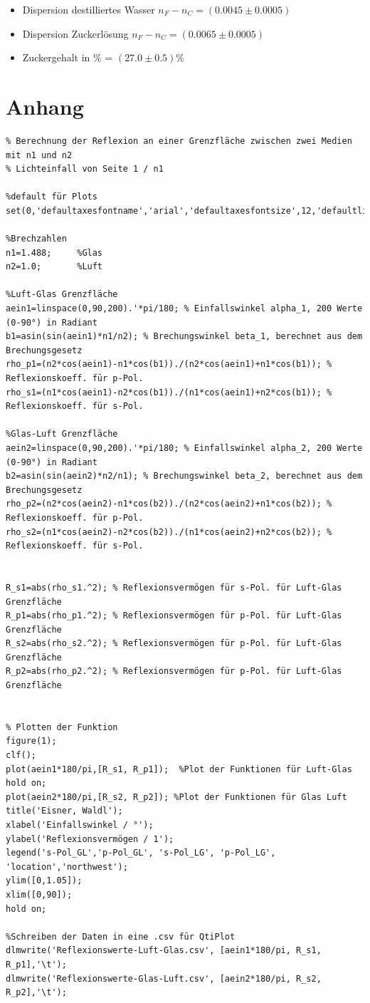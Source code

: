\documentclass[12pt,a4paper,twoside]{article}
\begin{document}
\begin{itemize}
    \item Dispersion destilliertes Wasser $n_F-n_C = (0.0045 \pm 0.0005)$
    \item Dispersion Zuckerlösung $n_F-n_C = (0.0065 \pm 0.0005)$
    \item Zuckergehalt in \% = $(27.0 \pm 0.5) \%$
\end{itemize}



\section{Anhang}

\begin{verbatim}
% Berechnung der Reflexion an einer Grenzfläche zwischen zwei Medien mit n1 und n2
% Lichteinfall von Seite 1 / n1

%default für Plots
set(0,'defaultaxesfontname','arial','defaultaxesfontsize',12,'defaultlinelinewidth',2);

%Brechzahlen
n1=1.488;     %Glas
n2=1.0;       %Luft             

%Luft-Glas Grenzfläche
aein1=linspace(0,90,200).'*pi/180; % Einfallswinkel alpha_1, 200 Werte (0-90°) in Radiant
b1=asin(sin(aein1)*n1/n2); % Brechungswinkel beta_1, berechnet aus dem Brechungsgesetz
rho_p1=(n2*cos(aein1)-n1*cos(b1))./(n2*cos(aein1)+n1*cos(b1)); % Reflexionskoeff. für p-Pol.
rho_s1=(n1*cos(aein1)-n2*cos(b1))./(n1*cos(aein1)+n2*cos(b1)); % Reflexionskoeff. für s-Pol.

%Glas-Luft Grenzfläche
aein2=linspace(0,90,200).'*pi/180; % Einfallswinkel alpha_2, 200 Werte (0-90°) in Radiant
b2=asin(sin(aein2)*n2/n1); % Brechungswinkel beta_2, berechnet aus dem Brechungsgesetz
rho_p2=(n2*cos(aein2)-n1*cos(b2))./(n2*cos(aein2)+n1*cos(b2)); % Reflexionskoeff. für p-Pol.
rho_s2=(n1*cos(aein2)-n2*cos(b2))./(n1*cos(aein2)+n2*cos(b2)); % Reflexionskoeff. für s-Pol.


R_s1=abs(rho_s1.^2); % Reflexionsvermögen für s-Pol. für Luft-Glas Grenzfläche
R_p1=abs(rho_p1.^2); % Reflexionsvermögen für p-Pol. für Luft-Glas Grenzfläche
R_s2=abs(rho_s2.^2); % Reflexionsvermögen für p-Pol. für Luft-Glas Grenzfläche
R_p2=abs(rho_p2.^2); % Reflexionsvermögen für p-Pol. für Luft-Glas Grenzfläche


% Plotten der Funktion
figure(1);
clf();
plot(aein1*180/pi,[R_s1, R_p1]);  %Plot der Funktionen für Luft-Glas
hold on;
plot(aein2*180/pi,[R_s2, R_p2]); %Plot der Funktionen für Glas Luft
title('Eisner, Waldl');
xlabel('Einfallswinkel / °');
ylabel('Reflexionsvermögen / 1');
legend('s-Pol_GL','p-Pol_GL', 's-Pol_LG', 'p-Pol_LG', 'location','northwest');
ylim([0,1.05]);
xlim([0,90]);
hold on;

%Schreiben der Daten in eine .csv für QtiPlot
dlmwrite('Reflexionswerte-Luft-Glas.csv', [aein1*180/pi, R_s1, R_p1],'\t');
dlmwrite('Reflexionswerte-Glas-Luft.csv', [aein2*180/pi, R_s2, R_p2],'\t');
\end{verbatim}

\printbibliography[heading=bibintoc]
\end{document}
